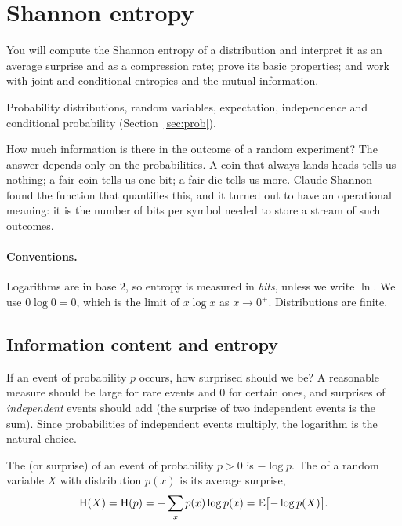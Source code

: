 \section{Shannon entropy}\label{sec:shannon}

\begin{objectives}
  You will compute the Shannon entropy of a distribution and interpret it as an average surprise and as a compression rate; prove its basic properties; and work with joint and conditional entropies and the mutual information.
\end{objectives}

\begin{recall}
  Probability distributions, random variables, expectation, independence and conditional probability (Section~\ref{sec:prob}).
\end{recall}

How much information is there in the outcome of a random experiment? The answer depends only on the probabilities. A coin that always lands heads tells us nothing; a fair coin tells us one bit; a fair die tells us more. Claude Shannon~\cite{shannon1948} found the function that quantifies this, and
it turned out to have an operational meaning: it is the number of bits per symbol needed to store a stream of such outcomes.

\paragraph{Conventions.}
Logarithms are in base $2$, so entropy is measured in \emph{bits}, unless we write $\ln$. We use $0\log0=0$, which is the limit of $x\log x$ as $x\to0^+$. Distributions are finite.

\subsection{Information content and entropy}

If an event of probability $p$ occurs, how surprised should we be? A reasonable measure should be large for rare events and $0$ for certain ones, and surprises of \emph{independent} events should add (the surprise of two independent events is the sum). Since probabilities of independent events multiply, the logarithm is the natural choice.

\begin{definition}\label{def:shannon}
  The  (or surprise) of an event of probability $p>0$ is $-\log p$. The  of a random variable $X$ with distribution $p(x)$ is its average surprise,
  \[
    \mathrm{H}(X)=\mathrm{H}(p)=-\sum_xp(x)\log p(x)=\mathbb{E}\bigl[-\log p(X)\bigr].
  \]
\end{definition}

